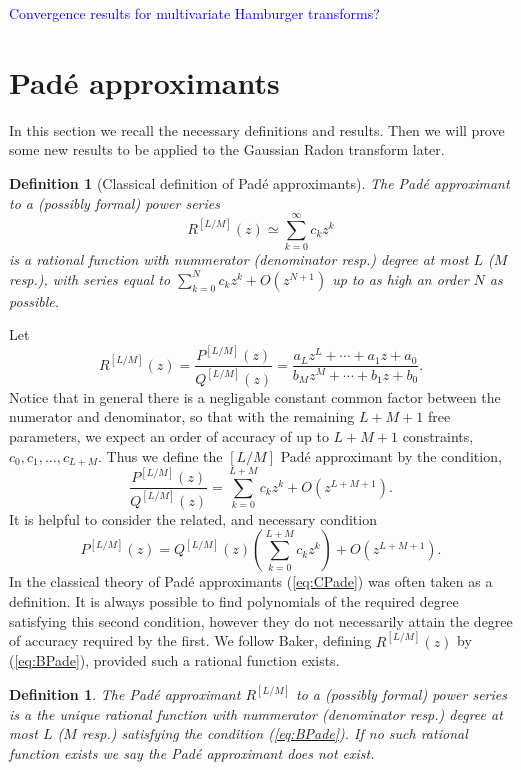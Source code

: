 \documentclass{amsart}
\newtheorem{definition}[theorem]{Definition}
\theoremstyle{remark}
\numberwithin{equation}{section}
\newcommand{\tc}{\textcolor{blue}}
\begin{document}
\tc{Convergence results for multivariate Hamburger transforms?}

\section{Pad\'e approximants}

In this section we recall the necessary definitions and results. Then we will prove some new results to be applied to the Gaussian Radon transform later.

\begin{definition}[Classical definition of Pad\'e approximants]
The Pad\'e approximant to a (possibly formal) power series 
\[
    R^{[L/M]}(z) \simeq \sum_{k=0}^\infty c_k z^k
\]
is a rational function with nummerator (denominator resp.) degree at most $L$ ($M$ resp.), with series equal to $\sum_{k=0}^N c_k z^k + O(z^{N+1})$ up to as high an order $N$ as possible. 
\end{definition}
Let
\[
    R^{[L/M]}(z) = \frac{P^{[L/M]}(z)}{Q^{[L/M]}(z)} = \frac{a_Lz^L + \cdots + a_1z + a_0}{b_Mz^M + \cdots + b_1z + b_0}.
\]
Notice that in general there is a negligable constant common factor between the numerator and denominator, so that with the remaining $L+M+1$ free parameters, we expect an order of accuracy of up to $L+M+1$ constraints, $c_0, c_1, \ldots, c_{L+M}$. Thus we define the $[L/M]$ Pad\'e approximant by the condition,
\begin{equation}
    \label{eq:BPade}
    \frac{P^{[L/M]}(z)}{Q^{[L/M]}(z)} = \sum_{k=0}^{L+M} c_k z^k + O\left(z^{L+M+1}\right).
\end{equation}
It is helpful to consider the related, and necessary condition
\begin{equation}
    \label{eq:CPade}
    P^{[L/M]}(z) = Q^{[L/M]}(z)\left(\sum_{k=0}^{L+M} c_k z^k\right) + O\left(z^{L+M+1}\right).
\end{equation}
In the classical theory of Pad\'e approximants (\ref{eq:CPade}) was often taken as a definition. It is always possible to find polynomials of the required degree satisfying this second condition, however they do not necessarily attain the degree of accuracy required by the first. We follow Baker, defining $R^{[L/M]}(z)$ by (\ref{eq:BPade}), provided such a rational function exists.

\begin{definition}
    The Pad\'e approximant $R^{[L/M]}$ to a (possibly formal) power series is a the unique rational function with nummerator (denominator resp.) degree at most $L$ ($M$ resp.) satisfying the condition (\ref{eq:BPade}). If no such rational function exists we say the Pad\'e approximant does not exist.
\end{definition}
\end{document}

